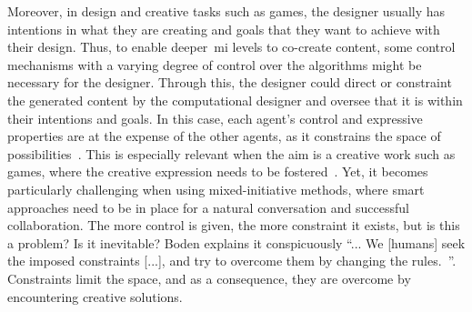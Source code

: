 


Moreover, in design and creative tasks such as games, the designer usually has intentions in what they are creating and goals that they want to achieve with their design. Thus, to enable deeper~\acrshort{mi} levels to co-create content, some control mechanisms with a varying degree of control over the algorithms might be necessary for the designer. Through this, the designer could direct or constraint the generated content by the computational designer and oversee that it is within their intentions and goals. In this case, each agent's control and expressive properties are at the expense of the other agents, as it constrains the space of possibilities~\cite{baldwin_mixed-initiative_2017}. This is especially relevant when the aim is a creative work such as games, where the creative expression needs to be fostered~\cite{alvarez_fostering_2018}. Yet, it becomes particularly challenging when using mixed-initiative methods, where smart approaches need to be in place for a natural conversation and successful collaboration. The more control is given, the more constraint it exists, but is this a problem? Is it inevitable? Boden explains it conspicuously ``...  We [humans] seek the imposed constraints [...], and try to overcome them by changing the rules.~\cite{boden_creative_2004}''. Constraints limit the space, and as a consequence, they are overcome by encountering creative solutions.

